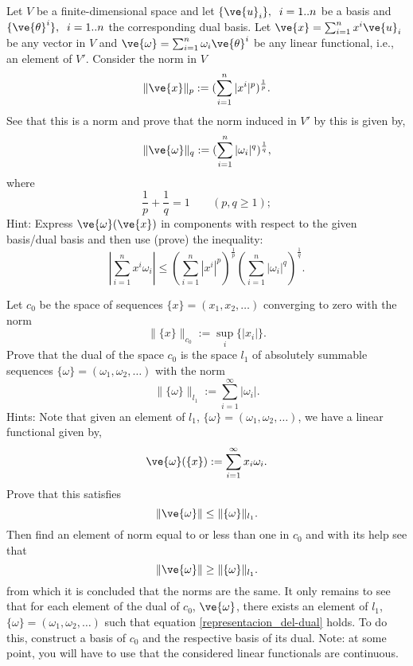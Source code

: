 \bpro
Let $V$ be a finite-dimensional space and let $\{\ve{u}_i\},\;\;i=1..n$
be a basis and $\{\ve{\theta}^i\},\;\;i=1..n$ the corresponding dual basis.
Let $\ve{x} = \sum_{i=1}^n x^i \ve{u}_i$ be any vector in $V$ and
$\ve{\omega} = \sum_{i=1}^n \omega_i \ve{\theta}^i$ 
be any linear functional,
i.e., an element of $V'$. 
Consider the norm in $V$
\begin{equation}
  \label{eq:norma_p}
  \|\ve{x}\|_p := (\sum_{i=1}^n |x^i|^p)^{\frac{1}{p}}.
\end{equation}
See that this is a norm and prove that
the norm induced in $V'$ by this is given by,
\begin{equation}
  \label{eq:norma_q}
  \|\ve{\omega}\|_q := (\sum_{i=1}^n |\omega_i|^q)^{\frac{1}{q}},
\end{equation}
%
where 
\begin{equation}
  \label{eq:relacion_p_q}
  \frac{1}{p} + \frac{1}{q} = 1\;\;\;\;\;\;\; (p,q \geq 1);
\end{equation}
%
Hint: Express $\ve{\omega}(\ve{x})$ in components with respect to the 
given basis/dual basis and then use (prove) the inequality:
\begin{equation}
  \label{eq:holder}
  |\sum_{i=1}^{n} x^i \omega_i | \leq 
        (\sum_{i=1}^n |x^i|^p)^{\frac{1}{p}} 
        (\sum_{i=1}^n |\omega_i|^q)^{\frac{1}{q}}.
\end{equation}

\epro


\bpro
Let $c_0$ be the space of sequences 
$\{x\} = (x_1,x_2, \dots)$
converging to zero with the norm
\begin{equation}
  \label{eq:norma_c_0}
  \|\{x\}\|_{c_0} := \sup_{i} \{|x_i|\}.
\end{equation}
%
Prove that the dual of the space $c_0$ is the space $l_1$ of absolutely summable sequences
$\{\omega\}= (\omega_1,\omega_2, \dots)$ with the norm
\begin{equation}
  \label{eq:norma_l_1}
  \|\{\omega\}\|_{l_1} := \sum_{i=1}^{\infty} |\omega_i|.
\end{equation}
%
Hints: 
Note that given an element of $l_1$, $\{\omega\}=(\omega_1,\omega_2,\dots)$,
we have a linear functional given by,
\begin{equation}
  \label{representacion_del-dual}
  \ve{\omega}(\{x\}) := \sum_{i=1}^{\infty} x_i \omega_i.
\end{equation}
Prove that this satisfies 
\begin{equation}
  \|\ve{\omega}\| \leq \|\{\omega\}\|_{l_1}.
\end{equation}
Then find an element of norm equal to or less than one in $c_0$ 
and with its help see that 
\begin{equation}
  \|\ve{\omega}\| \geq \|\{\omega\}\|_{l_1}.
\end{equation}
from which it is concluded that the norms are the same.
It only remains to see that for each element of the dual of $c_0$, $\ve{\omega}$,
there exists an element of $l_1$, $\{\omega\}=(\omega_1,\omega_2,\dots)$ such that 
equation \ref{representacion_del-dual} holds. 
To do this, construct a basis of $c_0$ and the respective basis of its dual.
Note: at some point, you will have to use that the considered linear functionals
are continuous.
\epro

